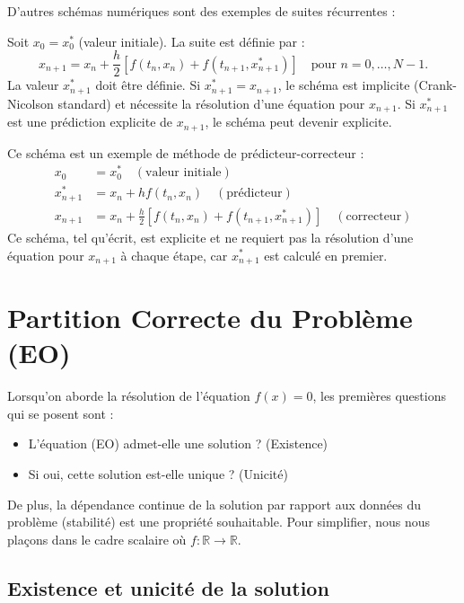 D'autres schémas numériques sont des exemples de suites récurrentes :
\begin{example}
Soit $x_0 = x_0^*$ (valeur initiale). La suite est définie par :
\[ x_{n+1} = x_n + \frac{h}{2} [f(t_n, x_n) + f(t_{n+1}, x_{n+1}^*)] \quad \text{pour } n=0, \dots, N-1. \]
La valeur $x_{n+1}^*$ doit être définie. Si $x_{n+1}^* = x_{n+1}$, le schéma est implicite (Crank-Nicolson standard) et nécessite la résolution d'une équation pour $x_{n+1}$. Si $x_{n+1}^*$ est une prédiction explicite de $x_{n+1}$, le schéma peut devenir explicite.
\end{example}

\begin{example}
Ce schéma est un exemple de méthode de prédicteur-correcteur :
\begin{align*} x_0 &= x_0^* \quad (\text{valeur initiale}) \\ x_{n+1}^* &= x_n + h f(t_n, x_n) \quad (\text{prédicteur}) \\ x_{n+1} &= x_n + \frac{h}{2} [f(t_n, x_n) + f(t_{n+1}, x_{n+1}^*)] \quad (\text{correcteur}) \end{align*}
Ce schéma, tel qu'écrit, est explicite et ne requiert pas la résolution d'une équation pour $x_{n+1}$ à chaque étape, car $x_{n+1}^*$ est calculé en premier.
\end{example}


\section{Partition Correcte du Problème (EO)}
Lorsqu'on aborde la résolution de l'équation $f(x)=0$, les premières questions qui se posent sont :
\begin{itemize}
    \item L'équation (EO) admet-elle une solution ? (Existence)
    \item Si oui, cette solution est-elle unique ? (Unicité)
\end{itemize}
De plus, la dépendance continue de la solution par rapport aux données du problème (stabilité) est une propriété souhaitable. Pour simplifier, nous nous plaçons dans le cadre scalaire où $f: \mathbb{R} \to \mathbb{R}$.

\subsection{Existence et unicité de la solution}

